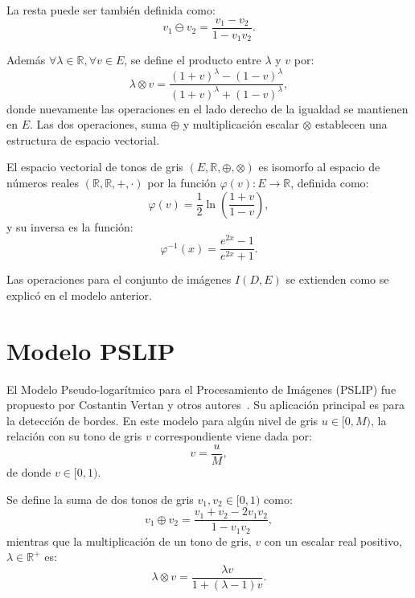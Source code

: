 La resta puede ser tambi\'en definida como:
\begin{equation}
	v_1\ominus v_2=\frac{v_1-v_2}{1-v_1v_2}.
\end{equation}

Adem\'as $\forall \lambda \in \mathbb{R}, \forall v \in E $, se define el producto entre $\lambda$ y $v$ por:
\begin{equation}
	\lambda \otimes v =\frac{(1+v)^\lambda-(1-v)^\lambda}{(1+v)^\lambda+(1-v)^\lambda},
\end{equation}
donde nuevamente las operaciones en el lado derecho de la igualdad se mantienen en $E$. Las dos operaciones, suma $\oplus$ y multiplicación escalar $\otimes$ establecen una estructura de espacio vectorial.

El espacio vectorial de tonos de gris $(E, \mathbb{R}, \oplus, \otimes)$ es isomorfo al espacio de números reales $(\mathbb{R},\mathbb{R}, +, \cdot)$ por la función $\varphi(v) : E \rightarrow \mathbb{R}$, definida como:
\begin{equation}
	\varphi(v)=\frac{1}{2}\ln\left(\frac{1+v}{1-v}\right),
\end{equation}
y su inversa es la funci\'on:
\begin{equation}
	\varphi^{-1}(x)=\frac{e^{2x}-1}{e^{2x}+1}.
\end{equation}

Las operaciones para el conjunto de im\'agenes $I(D,E)$ se extienden como se explic\'o en el modelo anterior.

\section{Modelo PSLIP}

El Modelo Pseudo-logar\'itmico para el Procesamiento de Im\'agenes (PSLIP) fue propuesto por Costantin Vertan y otros autores~\cite{vertan2008pseudo}. Su aplicaci\'on principal es para la detecci\'on de bordes. En este modelo para alg\'un nivel de gris $u\in[0,M)$, la relaci\'on con su tono de gris $v$ correspondiente viene dada por:
\begin{equation}
	v = \frac{u}{M},
\end{equation}
de donde $v\in[0,1)$.

Se define la suma de dos tonos de gris $v_1,v_2\in[0,1)$ como:
\begin{equation}
	v_1\oplus v_2=\frac{v_1 + v_2 - 2v_1v_2}{1-v_1v_2},
\end{equation}
mientras que la multiplicación de un tono de gris, $v$ con un escalar real positivo, $\lambda \in \mathbb{R}^+$ es:
\begin{equation}
	\lambda \otimes v = \frac{\lambda v}{1+(\lambda-1)v}.
\end{equation}

